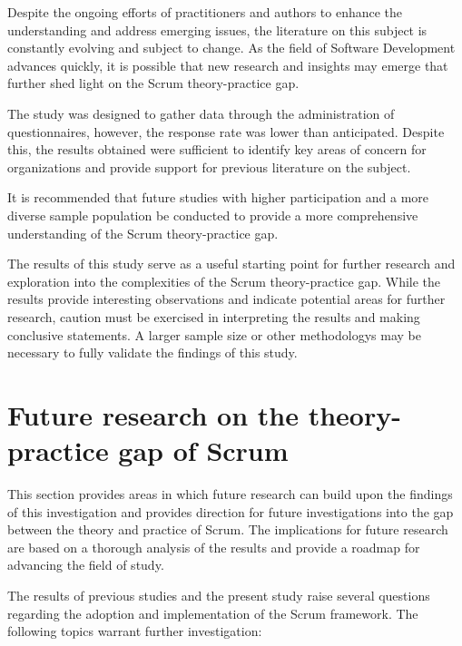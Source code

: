 Despite the ongoing efforts of practitioners and authors to enhance the understanding and address emerging issues, the literature on this subject is constantly evolving and subject to change. As the field of Software Development advances quickly, it is possible that new research and insights may emerge that further shed light on the Scrum theory-practice gap.

The study was designed to gather data through the administration of questionnaires, however, the response rate was lower than anticipated. Despite this, the results obtained were sufficient to identify key areas of concern for organizations and provide support for previous literature on the subject. 

It is recommended that future studies with higher participation and a more diverse sample population be conducted to provide a more comprehensive understanding of the Scrum theory-practice gap.

The results of this study serve as a useful starting point for further research and exploration into the complexities of the Scrum theory-practice gap. While the results provide interesting observations and indicate potential areas for further research, caution must be exercised in interpreting the results and making conclusive statements. A larger sample size or other \glspl{methodology} may be necessary to fully validate the findings of this study.

\section{Future research on the theory-practice gap of Scrum}\label{sec:Implicationsforfutureresearch}
This section provides areas in which future research can build upon the findings of this investigation and provides direction for future investigations into the gap between the theory and practice of Scrum. The implications for future research are based on a thorough analysis of the results and provide a roadmap for advancing the field of study.

The results of previous studies and the present study raise several questions regarding the \gls{adoption} and implementation of the Scrum \gls{framework}. The following topics warrant further investigation:

